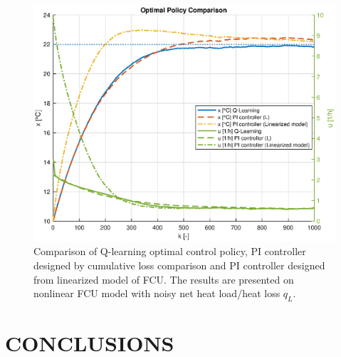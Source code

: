 \documentclass{ifacconf}
\begin{document}
\begin{figure}
\centering{}\includegraphics[width=0.95\columnwidth]{figures/optimal_policy_noisy}
\caption{\label{fig:Q-Learning-PI-PI-noisy}Comparison of Q-learning optimal
control policy, PI controller designed by cumulative loss comparison
and PI controller designed from linearized model of FCU. The results
are presented on nonlinear FCU model with noisy net heat load/heat
loss $q_{L}$.}
\end{figure}

\section{CONCLUSIONS}\label{sec:CONCLUSIONS}
\end{document}

